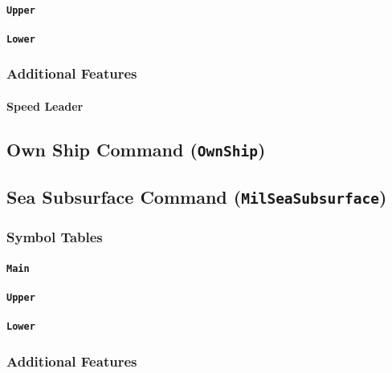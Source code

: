 \documentclass[a4paper, titlepage]{article}
\begin{document}
\paragraph{\texttt{Upper}}

\paragraph{\texttt{Lower}}

\subsubsection{Additional Features}

\paragraph{Speed Leader}

\subsection{Own Ship Command (\textbf{\texttt{OwnShip}})}

\subsection{Sea Subsurface Command (\textbf{\texttt{MilSeaSubsurface}})}

\subsubsection{Symbol Tables}

\paragraph{\texttt{Main}}

\paragraph{\texttt{Upper}}

\paragraph{\texttt{Lower}}

\subsubsection{Additional Features}
\end{document}
